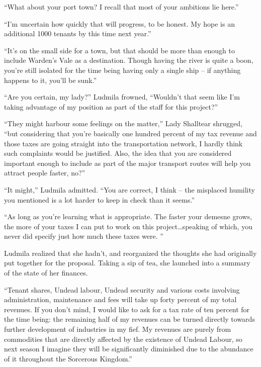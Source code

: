 

“What about your port town? I recall that most of your ambitions lie here.”

 

“I’m uncertain how quickly that will progress, to be honest. My hope is an additional 1000 tenants by this time next year.”

 

“It’s on the small side for a town, but that should be more than enough to include Warden’s Vale as a destination. Though having the river is quite a boon, you’re still isolated for the time being having only a single ship – if anything happens to it, you’ll be sunk.”

 

“Are you certain, my lady?” Ludmila frowned, “Wouldn’t that seem like I’m taking advantage of my position as part of the staff for this project?”

 

“They might harbour some feelings on the matter,” Lady Shalltear shrugged, “but considering that you’re basically one hundred percent of my tax revenue and those taxes are going straight into the transportation network, I hardly think such complaints would be justified. Also, the idea that you are considered important enough to include as part of the major transport routes will help you attract people faster, no?”

 

“It might,” Ludmila admitted. “You are correct, I think – the misplaced humility you mentioned is a lot harder to keep in check than it seems.”

 

“As long as you’re learning what is appropriate. The faster your demesne grows, the more of your taxes I can put to work on this project…speaking of which, you never did specify just how much these taxes were. ”

 

Ludmila realized that she hadn’t, and reorganized the thoughts she had originally put together for the proposal. Taking a sip of tea, she launched into a summary of the state of her finances.

 

“Tenant shares, Undead labour, Undead security and various costs involving administration, maintenance and fees will take up forty percent of my total revenues. If you don’t mind, I would like to ask for a tax rate of ten percent for the time being: the remaining half of my revenues can be turned directly towards further development of industries in my fief. My revenues are purely from commodities that are directly affected by the existence of Undead Labour, so next season I imagine they will be significantly diminished due to the abundance of it throughout the Sorcerous Kingdom.”

